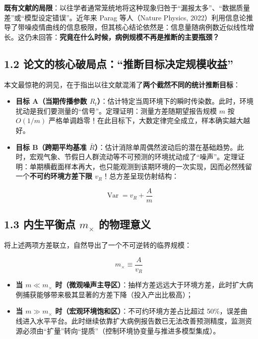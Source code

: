 \documentclass[11pt,a4paper]{ctexart}
\begin{document}
\textbf{既有文献的局限}：以往学者通常笼统地将这种现象归咎于“漏报太多”、“数据质量差”或“模型设定错误”。近年来 Parag 等人（Nature Physics, 2022）利用信息论推导了带噪疫情曲线的信息极限，但其核心结论依然是：信息量随病例数近似线性增长。这仍未回答：\textbf{究竟在什么时候，病例规模不再是推断的主要瓶颈？}


\subsection{1.2 论文的核心破局点：“推断目标决定规模收益”}

本文最惊艳的洞见，在于指出以往文献混淆了\textbf{两个截然不同的统计推断目标}：


\begin{itemize}[leftmargin=2em, itemsep=2pt, parsep=0pt]
\item \textbf{目标 A（当期传播参数 $R_t$）}：估计特定当周环境下的瞬时传染数。此时，环境扰动是我们要测量的“信号”。定理证明：测量方差随期望报告规模 $m$ 按 $O(1/m)$ 严格单调趋零！在此目标下，大数定律完全成立，样本确实越大越好。
\item \textbf{目标 B（跨期平均基准 $\bar{R}$）}：估计消除单周偶然波动后的潜在基础趋势。此时，宏观气象、节假日人群流动等不可预测的环境扰动成了“噪声”。定理证明：单期横截面样本再大，也只能观测到该期环境的一次实现，因而必然残留一个\textbf{不可约环境方差下限 $v_R$}！总方差呈现仿射结构：
\end{itemize}
\[
\operatorname{Var} = v_R + \frac{A}{m}
\]

\subsection{1.3 内生平衡点 $m_\times$ 的物理意义}

将上述两项方差联立，自然导出了一个不可逆转的临界规模：

\[
m_\times \equiv \frac{A}{v_R}
\]

\begin{itemize}[leftmargin=2em, itemsep=2pt, parsep=0pt]
\item \textbf{当 $m \ll m_\times$ 时（微观噪声主导区）}：抽样方差远远大于环境方差，此时扩大病例捕获能够带来极其显著的方差下降（投入产出比极高）；
\item \textbf{当 $m \gg m_\times$ 时（宏观环境饱和区）}：不可约环境方差占比超过 50\%，误差曲线进入水平平台。此时继续依靠扩大病例报告数已无法改善预测精度，监测资源必须由“扩量”转向“提质”（控制环境协变量与推进多模型集成）。
\end{itemize}
\end{document}
